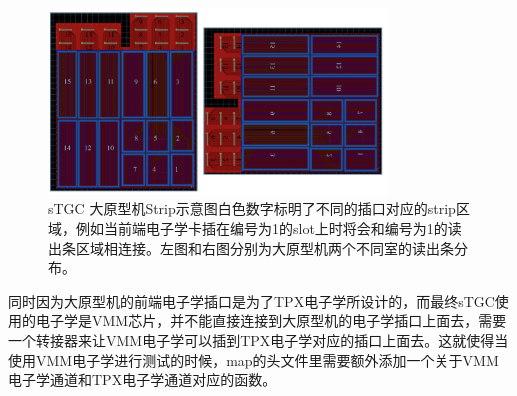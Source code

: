\begin{figure}[htb]
    \begin{center}
    \includegraphics[width=0.8\textwidth,clip]{figures/Chapter3/LargePrototype_PCB.png}
    \end{center}
    \caption[sTGC 大原型机Strip示意图]{sTGC 大原型机Strip示意图白色数字标明了不同的插口对应的strip区域，例如当前端电子学卡插在编号为1的slot上时将会和编号为1的读出条区域相连接。左图和右图分别为大原型机两个不同室的读出条分布。}
    \label{fig:LargePrototype_PCB}
\end{figure}

同时因为大原型机的前端电子学插口是为了TPX电子学所设计的，而最终sTGC使用的电子学是VMM芯片，并不能直接连接到大原型机的电子学插口上面去，需要一个转接器来让VMM电子学可以插到TPX电子学对应的插口上面去。这就使得当使用VMM电子学进行测试的时候，map的头文件里需要额外添加一个关于VMM电子学通道和TPX电子学通道对应的函数。

